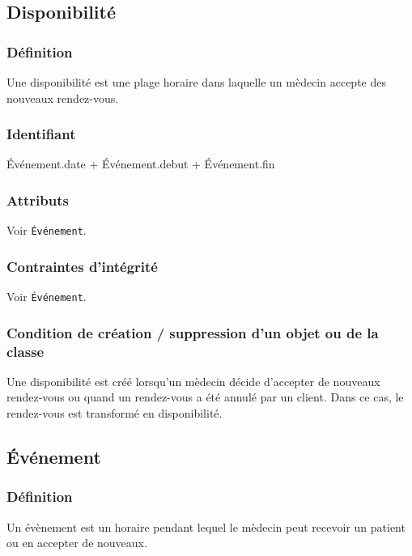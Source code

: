 \documentclass[a4paper, 11pt]{report}
\begin{document}
\subsection{Disponibilité}

\subsubsection{Définition}

Une disponibilité est une plage horaire dans laquelle un mèdecin accepte
des nouveaux rendez-vous.

\subsubsection{Identifiant}

Événement.date + Événement.debut + Événement.fin

\subsubsection{Attributs}

Voir \texttt{Événement}.

\subsubsection{Contraintes d'intégrité}

Voir \texttt{Événement}.

\subsubsection{Condition de création / suppression d'un objet ou de la classe}

Une disponibilité est créé lorsqu'un mèdecin décide d'accepter de nouveaux rendez-vous ou quand un
rendez-vous a été annulé par un client. Dans ce cas, le rendez-vous est transformé en disponibilité.

\subsection{Événement}

\subsubsection{Définition}

Un évènement est un horaire pendant lequel le mèdecin peut recevoir un patient ou en accepter de nouveaux.
\end{document}
